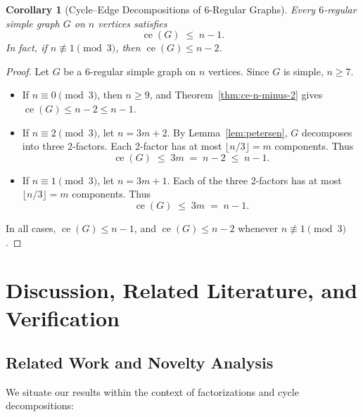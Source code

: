 \documentclass[11pt,reqno]{amsart}
\newtheorem{corollary}[theorem]{Corollary}
\theoremstyle{definition}
\theoremstyle{remark}
\DeclareMathOperator{\ce}{ce}
\begin{document}
\begin{corollary}[Cycle--Edge Decompositions of 6-Regular Graphs]\label{cor:six-regular-ce}
Every $6$-regular simple graph $G$ on $n$ vertices satisfies
\[
\ce(G) \;\le\; n - 1.
\]
In fact, if $n \not\equiv 1 \pmod 3$, then $\ce(G) \le n - 2$.
\end{corollary}

\begin{proof}
Let $G$ be a $6$-regular simple graph on $n$ vertices. Since $G$ is simple, $n \ge 7$.

\begin{itemize}
    \item If $n \equiv 0 \pmod 3$, then $n \ge 9$, and Theorem~\ref{thm:ce-n-minus-2} gives $\ce(G) \le n - 2 \le n - 1$.
    \item If $n \equiv 2 \pmod 3$, let $n = 3m + 2$. By Lemma~\ref{lem:petersen}, $G$ decomposes into three 2-factors. Each 2-factor has at most $\lfloor n/3 \rfloor = m$ components. Thus
    \[
    \ce(G) \;\le\; 3m \;=\; n - 2 \;\le\; n - 1.
    \]
    \item If $n \equiv 1 \pmod 3$, let $n = 3m + 1$. Each of the three 2-factors has at most $\lfloor n/3 \rfloor = m$ components. Thus
    \[
    \ce(G) \;\le\; 3m \;=\; n - 1.
    \]
\end{itemize}
In all cases, $\ce(G) \le n - 1$, and $\ce(G) \le n - 2$ whenever $n \not\equiv 1 \pmod 3$.
\end{proof}

\section{Discussion, Related Literature, and Verification}\label{sec:discussion}

\subsection{Related Work and Novelty Analysis}
We situate our results within the context of factorizations and cycle decompositions:
\end{document}
